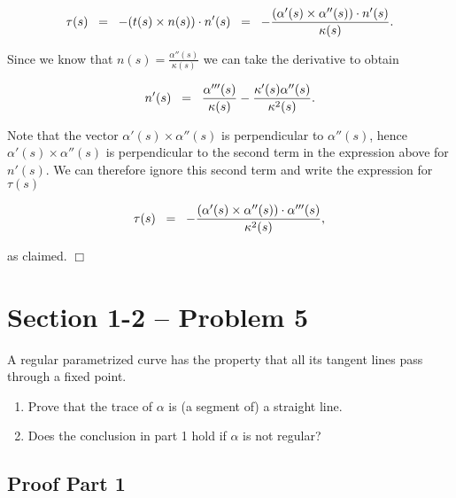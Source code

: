 \documentclass{article}
\begin{document}
\begin{equation*}
\tau(s) \;\; = \;\; - (t(s) \times n(s)) \cdot n'(s) \;\; = \;\; - \frac{(\alpha'(s) \times \alpha''(s)) \cdot n'(s)}{\kappa(s)}. \\
\end{equation*}

\noindent Since we know that $n(s) = \frac{\alpha''(s)}{\kappa(s)}$ we can take the derivative to obtain

\begin{equation*}
n'(s) \;\; =\;\; \frac{\alpha'''(s)}{\kappa(s)} - \frac{\kappa'(s) \alpha''(s)}{\kappa^2(s)}. \\
\end{equation*}

\noindent Note that the vector $\alpha'(s) \times \alpha''(s)$ is perpendicular to $\alpha''(s)$, hence $\alpha'(s) \times \alpha''(s)$ is perpendicular to the second term in the expression above for $n'(s)$.  We can therefore ignore this second term and write the expression for $\tau(s)$

\begin{equation*}
\tau(s) \;\; = \;\; - \frac{(\alpha'(s) \times \alpha''(s)) \cdot \alpha'''(s)}{\kappa^2(s)}, \\
\end{equation*}

\noindent as claimed. \hfill $\Box$


\section*{Section 1-2 -- Problem 5}

\noindent A regular parametrized curve has the property that all its tangent lines pass through a fixed point.

\begin{enumerate}
\item Prove that the trace of $\alpha$ is (a segment of) a straight line.  
\item Does the conclusion in part 1 hold if $\alpha$ is not regular?
\end{enumerate}

\subsection*{Proof Part 1}
\end{document}
